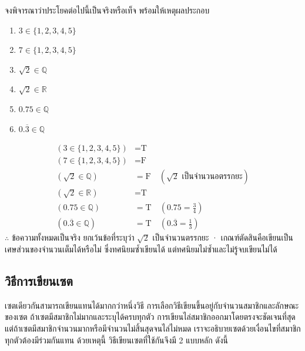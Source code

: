\begin{ex}
\label{ex:membership-check}
จงพิจารณาว่าประโยคต่อไปนี้เป็นจริงหรือเท็จ พร้อมให้เหตุผลประกอบ
\begin{enumerate}
    \item $3 \in \{1, 2, 3, 4, 5\}$
    \item $7 \in \{1, 2, 3, 4, 5\}$
    \item $\sqrt{2} \in \mathbb{Q}$
    \item $\sqrt{2} \in \mathbb{R}$
    \item $0.75 \in \mathbb{Q}$
    \item $0.\overline{3} \in \mathbb{Q}$
\end{enumerate}
\end{ex}

\begin{solution}
\begin{align*}
(3 \in \{1,2,3,4,5\}) &= \text{T}\\
(7 \in \{1,2,3,4,5\}) &= \text{F}\\
(\sqrt{2} \in \mathbb{Q}) &= \text{F} \quad (\sqrt{2} \text{ เป็นจำนวนอตรรกยะ})\\
(\sqrt{2} \in \mathbb{R}) &= \text{T}\\
(0.75 \in \mathbb{Q}) &= \text{T} \quad (0.75 = \tfrac{3}{4})\\
(0.\overline{3} \in \mathbb{Q}) &= \text{T} \quad (0.\overline{3} = \tfrac{1}{3})
\end{align*}
$\therefore$ ข้อความทั้งหมดเป็นจริง ยกเว้นข้อที่ระบุว่า $\sqrt{2}$ เป็นจำนวนตรรกยะ · เกณฑ์ตัดสินคือเขียนเป็นเศษส่วนของจำนวนเต็มได้หรือไม่ ซึ่งทศนิยมซ้ำเขียนได้ แต่ทศนิยมไม่ซ้ำและไม่รู้จบเขียนไม่ได้ \solhere
\end{solution}

\subsection{วิธีการเขียนเซต}
เซตเดียวกันสามารถเขียนแทนได้มากกว่าหนึ่งวิธี การเลือกวิธีเขียนขึ้นอยู่กับจำนวนสมาชิกและลักษณะของเซต ถ้าเซตมีสมาชิกไม่มากและระบุได้ครบทุกตัว การเขียนไล่สมาชิกออกมาโดยตรงจะชัดเจนที่สุด แต่ถ้าเซตมีสมาชิกจำนวนมากหรือมีจำนวนไม่สิ้นสุดจนไล่ไม่หมด เราจะอธิบายเซตด้วยเงื่อนไขที่สมาชิกทุกตัวต้องมีร่วมกันแทน ด้วยเหตุนี้ วิธีเขียนเซตที่ใช้กันจึงมี 2 แบบหลัก ดังนี้~\parencite{rosen2019discrete}

